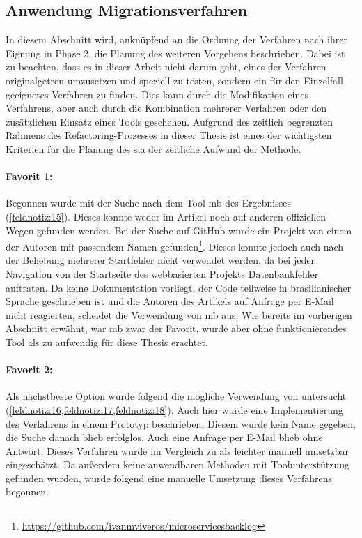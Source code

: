 \subsection{Anwendung Migrationsverfahren}
\label{sec:anwendung-verfahren}
In diesem Abschnitt wird, anknüpfend an die Ordnung der Verfahren nach ihrer Eignung in Phase 2, die Planung des weiteren Vorgehens beschrieben.
Dabei ist zu beachten, dass es in dieser Arbeit nicht darum geht, eines der Verfahren originalgetreu umzusetzen und speziell zu testen, sondern ein für den Einzelfall geeignetes Verfahren zu finden.
Dies kann durch die Modifikation eines Verfahrens, aber auch durch die Kombination mehrerer Verfahren oder den zusätzlichen Einsatz eines Tools geschehen.
Aufgrund des zeitlich begrenzten Rahmens des Refactoring-Prozesses in dieser Thesis ist eines der wichtigsten Kriterien für die Planung des \gls{sia} der zeitliche Aufwand der Methode.

\paragraph{Favorit 1:} Begonnen wurde mit der Suche nach dem Tool \gls{mb} des Ergebnisses  (\cref{feldnotiz:15}).
Dieses konnte weder im Artikel noch auf anderen offiziellen Wegen gefunden werden.
Bei der Suche auf GitHub wurde ein Projekt von einem der Autoren mit passendem Namen gefunden\footnote{\url{https://github.com/ivanmviveros/microservicesbacklog}}.
Dieses konnte jedoch auch nach der Behebung mehrerer Startfehler nicht verwendet werden, da bei jeder Navigation von der Startseite des webbasierten Projekts Datenbankfehler auftraten.
Da keine Dokumentation vorliegt, der Code teilweise in brasilianischer Sprache geschrieben ist und die Autoren des Artikels auf Anfrage per E-Mail nicht reagierten, scheidet die Verwendung von \gls{mb} aus.
Wie bereits im vorherigen Abschnitt erwähnt, war \gls{mb} zwar der Favorit, wurde aber ohne funktionierendes Tool als zu aufwendig für diese Thesis erachtet.

\paragraph{Favorit 2:} Als nächstbeste Option wurde folgend die mögliche Verwendung von  untersucht (\cref{feldnotiz:16,feldnotiz:17,feldnotiz:18}).
Auch hier wurde eine Implementierung des Verfahrens in einem Prototyp beschrieben.
Diesem wurde kein Name gegeben, die Suche danach blieb erfolglos.
Auch eine Anfrage per E-Mail blieb ohne Antwort.
Dieses Verfahren wurde im Vergleich zu   als leichter manuell umsetzbar eingeschätzt.
Da außerdem keine anwendbaren Methoden mit Toolunterstützung gefunden wurden, wurde folgend eine manuelle Umsetzung dieses Verfahrens begonnen.

